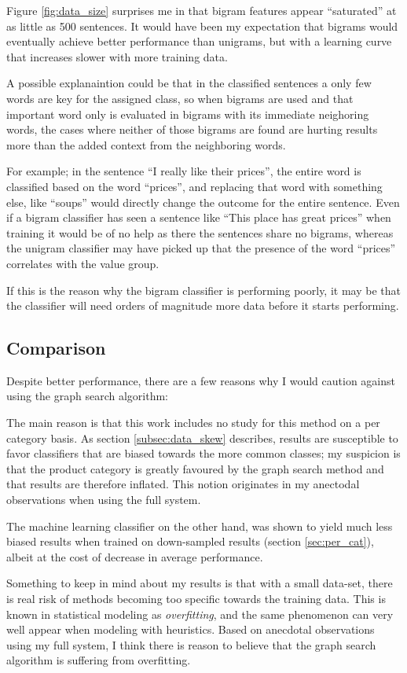 \documentclass[a4paper,11pt]{kth-mag}
\begin{document}
Figure \ref{fig:data_size} surprises me in that bigram features appear ``saturated'' at as little as 500 sentences.
It would have been my expectation that bigrams would eventually achieve better performance than unigrams, but
with a learning curve that increases slower with more training data.

A possible explanaintion could be that in the classified sentences a only few words are key for the assigned class,
so when bigrams are used and that important word only is evaluated in bigrams with its immediate neighoring words,
the cases where neither of those bigrams are found are hurting results more than the added context from the neighboring words.

For example; in the sentence ``I really like their prices'', the entire word is classified based on the word ``prices'', and replacing that word with something else, like ``soups'' would directly change the outcome for the entire sentence. Even if a bigram classifier has seen a sentence like ``This place has great prices'' when training it would be of no help as there the sentences share no bigrams, whereas the unigram classifier may have picked up that the presence of the word ``prices'' correlates with the value group.

If this is the reason why the bigram classifier is performing poorly, it may be that the classifier will need orders
of magnitude more data before it starts performing.


\subsection{Comparison}
Despite better performance, there are a few reasons why I would caution against using the graph search algorithm:

The main reason is that this work includes no study for this method on a per category basis.
As section \ref{subsec:data_skew} describes, results are
susceptible to favor classifiers that are biased towards the more common classes; my suspicion is that
the product category is greatly favoured by the graph search method and that results are therefore inflated.
This notion originates in my anectodal observations when using the full system.

The machine learning classifier on the other hand, was shown to yield much less biased results
when trained on down-sampled results (section \ref{sec:per_cat}), albeit at the cost of
decrease in average performance.

Something to keep in mind about my results is that with a small data-set,
there is real risk of methods becoming too specific towards the training data.
This is known in statistical modeling as \emph{overfitting},
and the same phenomenon can very well appear when modeling with heuristics.
Based on anecdotal observations using my full system, I think there is reason to believe that
the graph search algorithm is suffering from overfitting.
\end{document}
